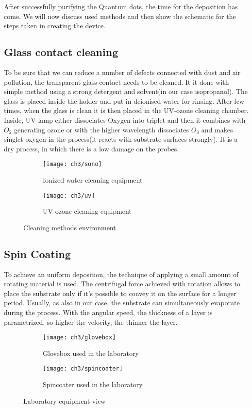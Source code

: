 After successfully purifying the Quantum dots, the time for the deposition has come. We will now discuss used methods and then show the schematic for the steps taken in creating the device. 

\subsection{Glass contact cleaning}

To be sure that we can reduce a number of defects connected with dust and air pollution, the transparent glass contact needs to be cleaned. It it done with simple method using a strong detergent and solvent(in our case isopropanol). The glass is placed inside the holder and put in deionised water for rinsing. After few times, when the glass is clean it is then placed in the UV-ozone cleaning chamber. Inside, UV lamp either dissociates Oxygen into triplet and then it combines with $O_2$ generating ozone or with the higher wavelength dissociates $O_3$ and makes singlet oxygen in the process(it reacts with substrate surfaces strongly). It is a dry process, in which there is a low damage on the probes. 

\begin{figure}[ht]
\begin{subfigure}{.5\textwidth}
  \centering
  \texttt{[image: ch3/sono]}  
  \caption{Ionized water cleaning equipment}
\end{subfigure}
\begin{subfigure}{.5\textwidth}
  \centering
  \texttt{[image: ch3/uv]}  
  \caption{UV-ozone cleaning equipment}
\end{subfigure}
\caption{Cleaning methods environment}
\label{fig:clean}
\end{figure}

\subsection{Spin Coating}
To achieve an uniform deposition, the technique of applying a small amount of rotating material is used. The centrifugal force achieved with rotation allows to place the substrate only if it's possible to convey it on the surface for a longer period. Usually, as also in our case, the substrate can simultaneously evaporate during the process. With the angular speed, the thickness of a layer is parametrized, so higher the velocity, the thinner the layer. 


\begin{figure}[H]
\begin{subfigure}{.5\textwidth}
  \centering
  \texttt{[image: ch3/glovebox]}  
  \caption{Glovebox used in the laboratory}
\end{subfigure}
\begin{subfigure}{.5\textwidth}
  \centering
  \texttt{[image: ch3/spincoater]}  
  \caption{Spincoater used in the laboratory}
\end{subfigure}
\label{fig:gloves}
\caption{Laboratory equipment view}
\end{figure}

